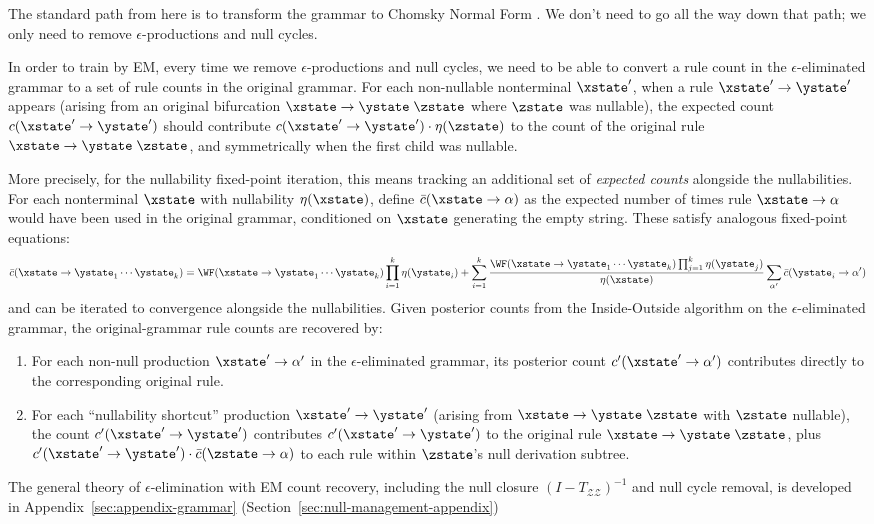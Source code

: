 The standard path from here is to transform the grammar to Chomsky Normal Form  \cite{stolcke-1995-efficient}.
We don't need to go all the way down that path;
we only need to remove $\epsilon$-productions and null cycles.

In order to train by EM, every time we remove $\epsilon$-productions and null cycles,
we need to be able to convert a rule count in the $\epsilon$-eliminated grammar
to a set of rule counts in the original grammar.
For each non-nullable nonterminal $\xstate'$, when a rule
$\xstate' \to \ystate'$ appears (arising from an original bifurcation
$\xstate \to \ystate\;\zstate$ where $\zstate$ was nullable),
the expected count $c(\xstate' \to \ystate')$ should contribute
$c(\xstate' \to \ystate') \cdot \nullability(\zstate)$ to the count
of the original rule $\xstate \to \ystate\;\zstate$, and symmetrically
when the first child was nullable.

More precisely, for the nullability fixed-point iteration, this means
tracking an additional set of \emph{expected counts} alongside
the nullabilities.
For each nonterminal $\xstate$ with nullability $\nullability(\xstate)$,
define $\bar{c}(\xstate \to \alpha)$ as the expected number of times
rule $\xstate \to \alpha$ would have been used in the original grammar,
conditioned on $\xstate$ generating the empty string.
These satisfy analogous fixed-point equations:
\[
\bar{c}(\xstate \to \ystate_1 \cdots \ystate_k) =
\WF(\xstate \to \ystate_1 \cdots \ystate_k) \prod_{i=1}^k \nullability(\ystate_i)
+ \sum_{i=1}^k \frac{\WF(\xstate \to \ystate_1 \cdots \ystate_k) \prod_{j=1}^k \nullability(\ystate_j)}
{\nullability(\xstate)} \sum_{\alpha'} \bar{c}(\ystate_i \to \alpha')
\]
and can be iterated to convergence alongside the nullabilities.
Given posterior counts from the Inside-Outside algorithm on the
$\epsilon$-eliminated grammar, the original-grammar rule counts
are recovered by:
\begin{enumerate}
\item For each non-null production $\xstate' \to \alpha'$ in the
  $\epsilon$-eliminated grammar, its posterior count $c'(\xstate' \to \alpha')$
  contributes directly to the corresponding original rule.
\item For each ``nullability shortcut'' production
  $\xstate' \to \ystate'$ (arising from
  $\xstate \to \ystate\;\zstate$ with $\zstate$ nullable),
  the count $c'(\xstate' \to \ystate')$ contributes
  $c'(\xstate' \to \ystate')$ to the original rule
  $\xstate \to \ystate\;\zstate$, plus
  $c'(\xstate' \to \ystate') \cdot \bar{c}(\zstate \to \alpha)$
  to each rule within $\zstate$'s null derivation subtree.
\end{enumerate}
The general theory of $\epsilon$-elimination with EM count recovery,
including the null closure $(I - T_{\mathcal{Z}\mathcal{Z}})^{-1}$
and null cycle removal, is developed in
Appendix~\ref{sec:appendix-grammar} (Section~\ref{sec:null-management-appendix})

